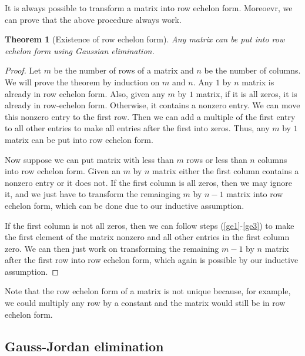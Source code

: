 \documentclass[12pt,reqno]{amsart}
\newtheorem{theorem}{Theorem}[section]
\theoremstyle{definition}
\begin{document}
It is always possible to transform a matrix into row echelon
form. Moreoevr, we can prove that the above procedure always work.
\begin{theorem}[Existence of row echelon form] \label{thm:ge}
  Any matrix can be put into row echelon form using Gaussian
  elimination. 
\end{theorem}
\begin{proof}
  Let $m$ be the number of rows of a matrix and $n$ be the number of
  columns. We will prove the theorem by induction on $m$ and $n$. Any
  $1$ by $n$ matrix is already in row echelon form. Also, given any
  $m$ by $1$ matrix, if it is all zeros, it is already in row-echelon
  form. Otherwise, it contains a nonzero entry. We can move this
  nonzero entry to the first row. Then we can add a multiple of the
  first entry to all other entries to make all entries after the first
  into zeros. Thus, any $m$ by $1$ matrix can be put into row echelon
  form.
  
  Now suppose we can put matrix with less than $m$ rows or less than
  $n$ columns into row echelon form. Given an $m$ by $n$ matrix either
  the first column contains a nonzero entry or it does not. If the
  first column is all zeros, then we may ignore it, and we just have
  to transform the remainging $m$ by $n-1$ matrix into row echelon
  form, which can be done due to our inductive assumption. 
  
  If the first column is not all zeros, then we can follow steps
  (\ref{ge1}-\ref{ge3}) to make the first element of the matrix
  nonzero and all other entries in the first column zero. We can then
  just work on transforming the remaining $m-1$ by $n$ matrix after
  the first row into row echelon form, which again is possible by our
  inductive assumption.
\end{proof}
Note that the row echelon form of a matrix is not unique because, for
example, we could multiply any row by a constant and the matrix would
still be in row echelon form. 

\subsection{Gauss-Jordan elimination}
\end{document}
